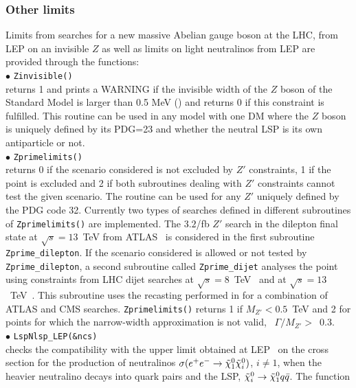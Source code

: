 \documentclass[12pt,a4paper]{article}
\begin{document}
\subsubsection{Other limits}

Limits from searches for a new massive Abelian gauge boson at the LHC, from LEP on an invisible $Z$ as well as limits on light neutralinos from LEP are provided through the functions: \\[2mm]
%
\noi$\bullet$ \verb|Zinvisible()|\\
returns 1 and prints a WARNING if the invisible width of the $Z$ boson of the Standard Model 
is larger than 0.5 MeV (\cite{Freitas:2014hra}) and returns 0 if this constraint is fulfilled.
This routine can be used in any model with one DM where the $Z$ boson is  uniquely defined by its PDG=23 and whether the neutral LSP is its own antiparticle or not.\\[2mm]
%
\noi$\bullet$ \verb|Zprimelimits()|\\
returns 0 if the scenario considered is not excluded by $Z'$ constraints, 1 if the point is excluded and 2 if both subroutines dealing with $Z'$ constraints cannot test the given scenario. The routine can be used for any $Z'$ uniquely defined by the PDG code 32.
Currently two types of searches defined in different subroutines of \verb|Zprimelimits()| are implemented.
The $3.2$/fb $Z'$ search in the dilepton final state at $\sqrt{s} = 13$~TeV from ATLAS~\cite{Aaboud:2016cth} is considered in the first subroutine \verb|Zprime_dilepton|. If the scenario considered is allowed or not tested by \verb|Zprime_dilepton|, a second subroutine called \verb|Zprime_dijet| analyses the point using constraints from LHC dijet searches at $\sqrt{s} = 8$~TeV~\cite{Aad:2014aqa,Khachatryan:2015sja,Khachatryan:2016ecr} and at $\sqrt{s} = 13$~TeV~\cite{ATLAS:2015nsi,Khachatryan:2015dcf}. This subroutine uses the recasting  performed  in \cite{Fairbairn:2016iuf} for a combination of ATLAS and CMS searches.
\verb|Zprimelimits()| returns 1 if $M_{Z'}<0.5$~TeV and  2 for points  for which the narrow-width approximation is not valid, \ie~$\Gamma/M_{Z'}>$~0.3.\\[2mm]
%
\noi$\bullet$   \verb|LspNlsp_LEP(&ncs)|\\
checks  the compatibility with the upper limit obtained at LEP~\cite{Abbiendi:2003sc} on the cross section for the production of neutralinos 
$\sigma(e^+e^-\rightarrow \tilde\chi^0_1\tilde\chi^0_i)$, $i\neq 1$, when the heavier neutralino decays into quark pairs 
and the LSP, $\tilde\chi^0_i \rightarrow \tilde\chi^0_1 q\bar{q}$. The function 
\end{document}

